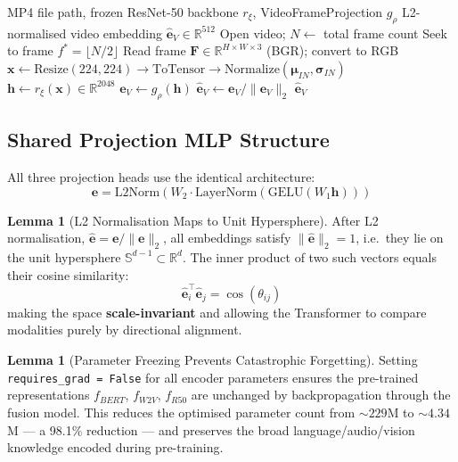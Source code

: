 \documentclass[12pt,a4paper]{article}
\theoremstyle{definition}
\newtheorem{lemma}[theorem]{Lemma}
\begin{document}
\begin{algorithm}[H]
\caption{\textsc{EncodeVideo} — ResNet-50 Middle-Frame Embedding}
\label{alg:enc_video}
\begin{algorithmic}[1]
\Require MP4 file path, frozen ResNet-50 backbone $r_\xi$, VideoFrameProjection $g_\rho$
\Ensure L2-normalised video embedding $\hat{\mathbf{e}}_V \in \mathbb{R}^{512}$
\State Open video; $N \gets$ total frame count
\State Seek to frame $f^* = \lfloor N/2 \rfloor$
\State Read frame $\mathbf{F} \in \mathbb{R}^{H \times W \times 3}$ (BGR); convert to RGB
\State $\mathbf{x} \gets \text{Resize}(224,224) \to \text{ToTensor} \to \text{Normalize}(\boldsymbol{\mu}_{IN}, \boldsymbol{\sigma}_{IN})$
\State $\mathbf{h} \gets r_\xi(\mathbf{x}) \in \mathbb{R}^{2048}$ 
\State $\mathbf{e}_V \gets g_\rho(\mathbf{h})$
\State $\hat{\mathbf{e}}_V \gets \mathbf{e}_V / \|\mathbf{e}_V\|_2$
\State \Return $\hat{\mathbf{e}}_V$
\end{algorithmic}
\end{algorithm}

\subsection{Shared Projection MLP Structure}

All three projection heads use the identical architecture:
\begin{equation}
\mathbf{e} = \text{L2Norm}\!\left(W_2 \cdot \text{LayerNorm}\!\left(\text{GELU}\!\left(W_1 \mathbf{h}\right)\right)\right)
\end{equation}

\begin{lemma}[L2 Normalisation Maps to Unit Hypersphere]
After L2 normalisation, $\hat{\mathbf{e}} = \mathbf{e}/\|\mathbf{e}\|_2$, all embeddings satisfy $\|\hat{\mathbf{e}}\|_2 = 1$, i.e.\ they lie on the unit hypersphere $\mathbb{S}^{d-1} \subset \mathbb{R}^d$. The inner product of two such vectors equals their cosine similarity:
$$\hat{\mathbf{e}}_i^\top \hat{\mathbf{e}}_j = \cos(\theta_{ij})$$
making the space \textbf{scale-invariant} and allowing the Transformer to compare modalities purely by directional alignment.
\end{lemma}

\begin{lemma}[Parameter Freezing Prevents Catastrophic Forgetting]
Setting \texttt{requires\_grad = False} for all encoder parameters ensures the pre-trained representations $f_{BERT}$, $f_{W2V}$, $f_{R50}$ are unchanged by backpropagation through the fusion model. This reduces the optimised parameter count from ${\sim}229$M to ${\sim}4.34$M — a 98.1\% reduction — and preserves the broad language/audio/vision knowledge encoded during pre-training.
\end{lemma}
\end{document}
